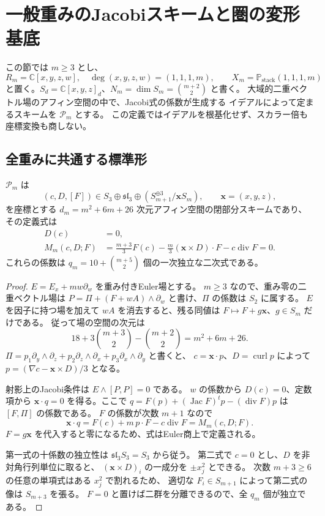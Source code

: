 \section{一般重みのJacobiスキームと圏の変形基底}
\label{sec:weighted-hulls-v33}

この節では $m\ge3$ とし、
\[
 R_m=\mathbb C[x,y,z,w],\quad \deg(x,y,z,w)=(1,1,1,m),\qquad
 X_m=\mathbb P_{\mathrm{stack}}(1,1,1,m)
\]
と置く。$S_d=\mathbb C[x,y,z]_d$、$N_m=\dim S_m=\binom{m+2}{2}$ と書く。
大域的二重ベクトル場のアフィン空間の中で、Jacobi式の係数が生成する
イデアルによって定まるスキームを $\mathscr P_m$ とする。
この定義ではイデアルを根基化せず、スカラー倍も座標変換も商しない。

\subsection{全重みに共通する標準形}

\begin{proposition}[一般重みの方程式]
\label{prop:general-equations-v33}
$\mathscr P_m$ は
\[
 (c,D,[F])\in S_3\oplus\mathfrak{sl}_3\oplus
       (S_{m+1}^{\oplus3}/\mathbf xS_m),\qquad \mathbf x=(x,y,z),
\]
を座標とする $d_m=m^2+6m+26$ 次元アフィン空間の閉部分スキームであり、
その定義式は
\begin{align}
 D(c)&=0,\label{eq:general-base-v33}\\
 M_m(c,D;F)&=
 \frac{m+3}{3}F(c)-\frac m3(\mathbf x\times D)\cdot F-c\operatorname{div}F=0.
 \label{eq:general-mixed-v33}
\end{align}
これらの係数は $q_m=10+\binom{m+5}{2}$ 個の一次独立な二次式である。
\end{proposition}

\begin{proof}
$E=E_x+mw\partial_w$ を重み付きEuler場とする。
$m\ge3$ なので、重み零の二重ベクトル場は
$P=\Pi+(F+wA)\wedge\partial_w$ と書け、$\Pi$ の係数は $S_2$ に属する。
$E$ を因子に持つ場を加えて $wA$ を消去すると、残る同値は
$F\mapsto F+g\mathbf x$、$g\in S_m$ だけである。
従って場の空間の次元は
\[
 18+3\binom{m+3}{2}-\binom{m+2}{2}=m^2+6m+26.
\]
$\Pi=p_1\partial_y\wedge\partial_z+p_2\partial_z\wedge\partial_x
+p_3\partial_x\wedge\partial_y$ と書くと、
$c=\mathbf x\cdot p$、$D=\operatorname{curl}p$ によって
$p=(\nabla c-\mathbf x\times D)/3$ となる。

射影上のJacobi条件は $E\wedge[P,P]=0$ である。
$w$ の係数から $D(c)=0$、定数項から
$\mathbf x\cdot q=0$ を得る。ここで
$q=F(p)+(\operatorname{Jac}F)^tp-(\operatorname{div}F)p$ は $[F,\Pi]$ の係数である。
$F$ の係数が次数 $m+1$ なので
\[
 \mathbf x\cdot q=F(c)+m\,p\cdot F-c\operatorname{div}F=M_m(c,D;F).
\]
$F=g\mathbf x$ を代入すると零になるため、式はEuler商上で定義される。

第一式の十係数の独立性は $\mathfrak{sl}_3 S_3=S_3$ から従う。
第二式で $c=0$ とし、$D$ を非対角行列単位に取ると、
$(\mathbf x\times D)_i$ の一成分を $\pm x_j^2$ とできる。
次数 $m+3\ge6$ の任意の単項式はある $x_j^2$ で割れるため、
適切な $F_i\in S_{m+1}$ によって第二式の像は $S_{m+3}$ を張る。
$F=0$ と置けば二群を分離できるので、全 $q_m$ 個が独立である。
\end{proof}

